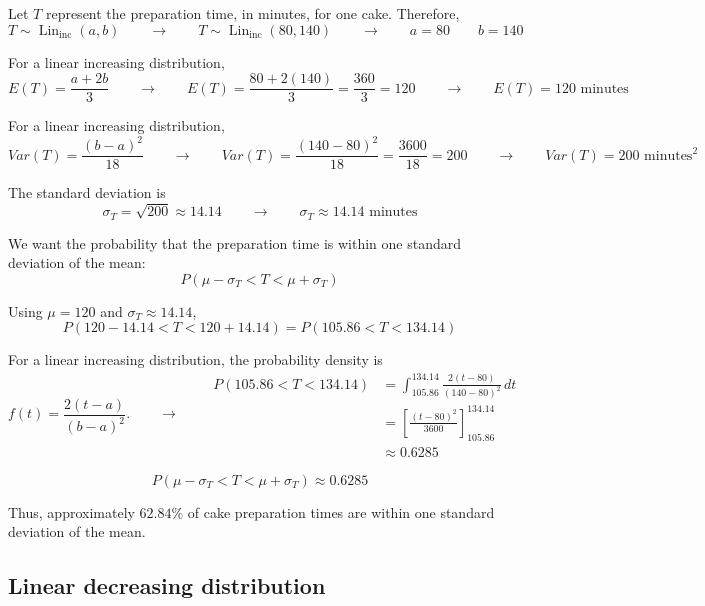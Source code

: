 Let $T$ represent the preparation time, in minutes, for one cake. Therefore,
\[
T\sim\operatorname{Lin}_{\mathrm{inc}}(a,b)
\qquad \longrightarrow \qquad
T\sim\operatorname{Lin}_{\mathrm{inc}}(80,140)
\qquad \longrightarrow \qquad
a=80\qquad b=140
\]



For a linear increasing distribution,
\[
E(T)=\frac{a+2b}{3}
\qquad \longrightarrow \qquad
E(T)
=\frac{80+2(140)}{3}
=\frac{360}{3}
=120
\qquad \longrightarrow \qquad
\boxed{E(T)=120\text{ minutes}}
\]


For a linear increasing distribution,
\[
Var(T)=\frac{(b-a)^2}{18}
\qquad \longrightarrow \qquad
Var(T)
=\frac{(140-80)^2}{18}
=\frac{3600}{18}
=200
\qquad \longrightarrow \qquad
\boxed{Var(T)=200\text{ minutes}^2}
\]


The standard deviation is
\[
\sigma_T=\sqrt{200}
\approx14.14
\qquad \longrightarrow \qquad
\boxed{\sigma_T\approx14.14\text{ minutes}}
\]


We want the probability that the preparation time is within one standard
deviation of the mean:
\[
P(\mu-\sigma_T<T<\mu+\sigma_T)
\]

Using $\mu=120$ and $\sigma_T\approx14.14$,
\[
P(120-14.14<T<120+14.14)
=
P(105.86<T<134.14)
\]

For a linear increasing distribution, the probability density is
\[
f(t)=\frac{2(t-a)}{(b-a)^2}.
\qquad \longrightarrow \qquad
\begin{aligned}
	P(105.86<T<134.14)
	&=\int_{105.86}^{134.14}
	\frac{2(t-80)}{(140-80)^2}\,dt\\[4pt]
	&=\left[
	\frac{(t-80)^2}{3600}
	\right]_{105.86}^{134.14}\\[4pt]
	&\approx 0.6285
\end{aligned}
\]

\[
\boxed{P(\mu-\sigma_T<T<\mu+\sigma_T)\approx0.6285}
\]

Thus, approximately $62.84\%$ of cake preparation times are within one
standard deviation of the mean.


\subsection{Linear decreasing distribution}\label{sec:c4-problem-linear-decreasing}

